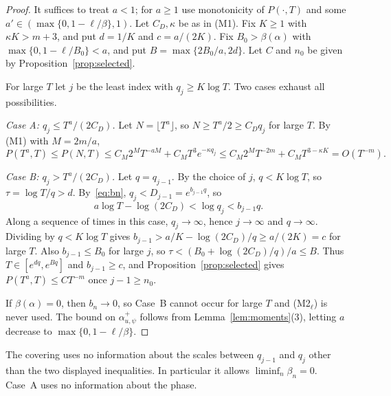 \begin{proof}
It suffices to treat $a<1$; for $a\ge1$ use monotonicity of $P(\cdot,T)$ and some $a'\in(\max\{0,1-\ell/\beta\},1)$. Let $C_D,\kappa$ be as in (M1). Fix $K\ge1$ with $\kappa K>m+3$, and put $d=1/K$ and $c=a/(2K)$. Fix $B_0>\beta(\alpha)$ with $\max\{0,1-\ell/B_0\}<a$, and put $B=\max\{2B_0/a,2d\}$. Let $C$ and $n_0$ be given by Proposition~\ref{prop:selected}.

For large $T$ let $j$ be the least index with $q_j\ge K\log T$. Two cases exhaust all possibilities.

\emph{Case A: $q_j\le T^a/(2C_D)$.} Let $N=\lfloor T^a\rfloor$, so $N\ge T^a/2\ge C_Dq_j$ for large $T$. By (M1) with $M=2m/a$,
\[
P(T^a,T)\le P(N,T)\le C_M2^MT^{-aM}+C_MT^3e^{-\kappa q_j}\le C_M2^MT^{-2m}+C_MT^{3-\kappa K}=O(T^{-m}).
\]

\emph{Case B: $q_j>T^a/(2C_D)$.} Let $q=q_{j-1}$. By the choice of $j$, $q<K\log T$, so $\tau=\log T/q>d$. By~\eqref{eq:bn}, $q_j<D_{j-1}=e^{b_{j-1}q}$, so
\[
a\log T-\log(2C_D)<\log q_j<b_{j-1}q.
\]
Along a sequence of times in this case, $q_j\to\infty$, hence $j\to\infty$ and $q\to\infty$. Dividing by $q<K\log T$ gives $b_{j-1}>a/K-\log(2C_D)/q\ge a/(2K)=c$ for large $T$. Also $b_{j-1}\le B_0$ for large $j$, so $\tau<(B_0+\log(2C_D)/q)/a\le B$. Thus $T\in[e^{dq},e^{Bq}]$ and $b_{j-1}\ge c$, and Proposition~\ref{prop:selected} gives $P(T^a,T)\le CT^{-m}$ once $j-1\ge n_0$.

If $\beta(\alpha)=0$, then $b_n\to0$, so Case~B cannot occur for large $T$ and (M2$_\ell$) is never used. The bound on $\alpha^+_{u,\psi}$ follows from Lemma~\ref{lem:moments}(3), letting $a$ decrease to $\max\{0,1-\ell/\beta\}$.
\end{proof}

The covering uses no information about the scales between $q_{j-1}$ and $q_j$ other than the two displayed inequalities. In particular it allows $\liminf_n\beta_n=0$. Case~A uses no information about the phase.
